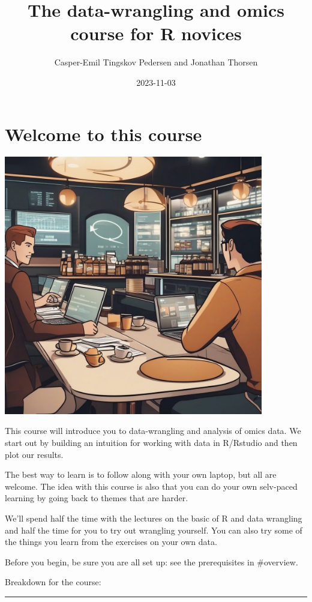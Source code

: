 \documentclass[
]{book}
\title{The data-wrangling and omics course for R novices}
\author{Casper-Emil Tingskov Pedersen and Jonathan Thorsen}
\date{2023-11-03}
\begin{document}
\frontmatter
\maketitle

\mainmatter
\hypertarget{welcome}{%
\chapter{Welcome to this course}\label{welcome}}

\includegraphics[width=0.85\textwidth,height=\textheight]{Data_analyses2.jpeg}

This course will introduce you to data-wrangling and analysis of omics
data. We start out by building an intuition for working with data in
R/Rstudio and then plot our results.

The best way to learn is to follow along with your own laptop, but all
are welcome. The idea with this course is also that you can do your own
selv-paced learning by going back to themes that are harder.

We'll spend half the time with the lectures on the basic of R and data
wrangling and half the time for you to try out wrangling yourself. You
can also try some of the things you learn from the exercises on your own
data.

Before you begin, be sure you are all set up: see the prerequisites in
\#overview.

Breakdown for the course:

\begin{center}\rule{0.5\linewidth}{0.5pt}\end{center}
\end{document}
